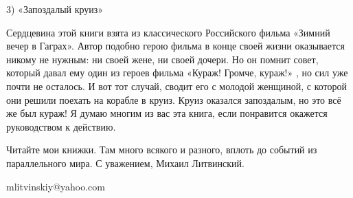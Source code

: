 
3) «Запоздалый круиз»

Сердцевина этой книги взята из классического Российского фильма «Зимний вечер в
Гаграх». Автор подобно герою фильма в конце своей жизни оказывается никому не
нужным: ни своей жене, ни своей дочери. Но он помнит совет, который давал ему
один из героев фильма «Кураж! Громче, кураж!» , но сил уже почти не осталось. И
вот тот случай, сводит его с молодой женщиной, с которой они решили поехать на
корабле в круиз. Круиз оказался запоздалым, но это всё же был кураж! Я думаю
многим из вас эта книга, если понравится окажется руководством к действию. 

Читайте мои книжки. Там много всякого и разного, вплоть до событий из
параллельного мира. С уважением, Михаил Литвинский.

mlitvinskiy@yahoo.com

